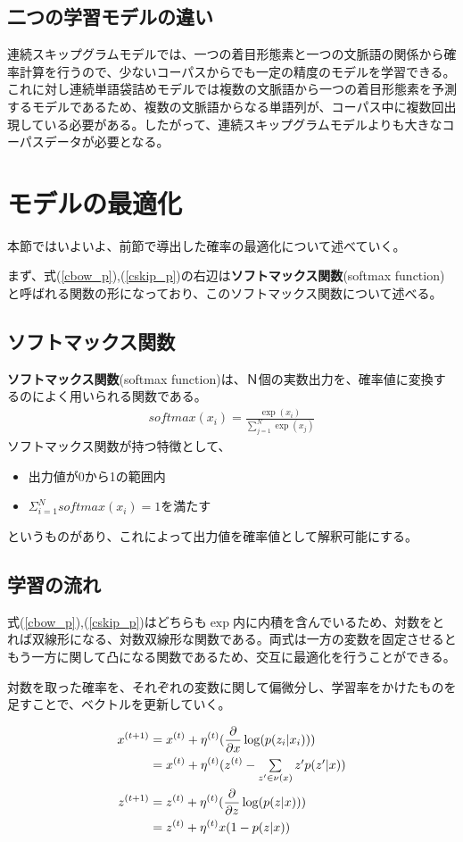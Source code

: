 \subsection{二つの学習モデルの違い}
連続スキップグラムモデルでは、一つの着目形態素と一つの文脈語の関係から確率計算を行うので、少ないコーパスからでも一定の精度のモデルを学習できる。これに対し連続単語袋詰めモデルでは複数の文脈語から一つの着目形態素を予測するモデルであるため、複数の文脈語からなる単語列が、コーパス中に複数回出現している必要がある。したがって、連続スキップグラムモデルよりも大きなコーパスデータが必要となる。\cite{book_wm}

\section{モデルの最適化}
本節ではいよいよ、前節で導出した確率の最適化について述べていく。

まず、式(\ref{cbow_p}),(\ref{cskip_p})の右辺は\textbf{ソフトマックス関数}(softmax function)と呼ばれる関数の形になっており、このソフトマックス関数について述べる。

\subsection{ソフトマックス関数}
\textbf{ソフトマックス関数}(softmax function)は、Ｎ個の実数出力を、確率値に変換するのによく用いられる関数である。
\begin{eqnarray}
  \label{softmax_p}
  softmax(x_i) = \frac{\exp(x_i)}{\sum_{j=1}^{N}\exp(x_j)}
\end{eqnarray}
ソフトマックス関数が持つ特徴として、
\begin{itemize}
  \item 出力値が0から1の範囲内
  \item $\Sigma_{i=1}^Nsoftmax(x_i)=1$を満たす
\end{itemize}
というものがあり、これによって出力値を確率値として解釈可能にする。

\subsection{学習の流れ}
式(\ref{cbow_p}),(\ref{cskip_p})はどちらも$\exp$内に内積を含んでいるため、対数をとれば双線形になる、対数双線形な関数である。両式は一方の変数を固定させるともう一方に関して凸になる関数であるため、交互に最適化を行うことができる。

対数を取った確率を、それぞれの変数に関して偏微分し、学習率をかけたものを足すことで、ベクトルを更新していく。

\begin{eqnarray}
  x^{(t+1)}&=x^{(t)}+\eta^{(t)}(\frac{\partial}{\partial x}\log(p(z_i|x_i))) \notag \\
    &=x^{(t)}+\eta^{(t)}(z^{(t)}-\textstyle\sum\limits_{z'\in\nu(x)}z'p(z'|x)) \\
  z^{(t+1)}&=z^{(t)}+\eta^{(t)}(\frac{\partial}{\partial z}\log(p(z|x))) \notag \\
    &=z^{(t)}+\eta^{(t)}x(1-p(z|x)) \\
\end{eqnarray}
